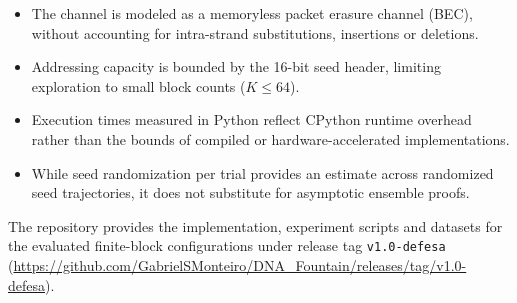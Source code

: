 \begin{itemize}
    \item The channel is modeled as a memoryless packet erasure channel (BEC), without accounting for intra-strand substitutions, insertions or deletions.
    
    \item Addressing capacity is bounded by the 16-bit seed header, limiting exploration to small block counts ($K \le 64$).
    
    \item Execution times measured in Python reflect CPython runtime overhead rather than the bounds of compiled or hardware-accelerated implementations.
    
    \item While seed randomization per trial provides an estimate across randomized seed trajectories, it does not substitute for asymptotic ensemble proofs.
\end{itemize}

The repository provides the implementation, experiment scripts and datasets for the evaluated finite-block configurations under release tag \texttt{v1.0-defesa} (\url{https://github.com/GabrielSMonteiro/DNA_Fountain/releases/tag/v1.0-defesa}).
